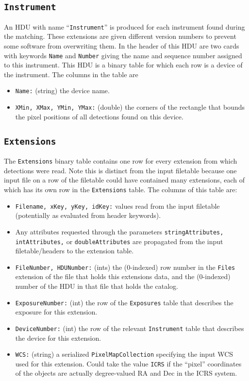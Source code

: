 \documentclass[11pt,preprint,flushrt]{aastex}
\begin{document}
\subsection{\tt Instrument}
An HDU with name ``{\tt Instrument}'' is produced for each instrument found during the matching.  These extensions are given different version numbers to prevent some software from overwriting them.  In the header of this HDU are two cards with keywords {\tt Name} and {\tt Number} giving the name and sequence number assigned to this instrument.  This HDU is a binary table for which each row is a device of the instrument.  The columns in the table are
\begin{itemize}
\item {\tt Name:} (string) the device name.
\item {\tt XMin, XMax, YMin, YMax:} (double) the corners of the rectangle that bounds the pixel positions of all detections found on this device.
\end{itemize}

\subsection{\tt Extensions}
The {\tt Extensions} binary table contains one row for every extension from which detections were read.  Note this is distinct from the input filetable because one input file on a row of the filetable could have contained many extensions, each of which has its own row in the {\tt Extensions} table.  The columns of this table are:
\begin{itemize}
\item {\tt Filename, xKey, yKey, idKey:} values read from the input filetable (potentially as evaluated from header keywords).
\item Any attributes requested through the parameters {\tt stringAttributes, intAttributes,} or {\tt doubleAttributes} are propagated from the input filetable/headers to the extension table.
\item {\tt FileNumber, HDUNumber:} (ints) the (0-indexed) row number in the {\tt Files} extension of the file that holds this extensions data, and the (0-indexed) number of the HDU in that file that holds the catalog.
\item {\tt ExposureNumber:} (int) the row of the {\tt Exposures} table that describes the exposure for this extension.
\item {\tt DeviceNumber:} (int) the row of the relevant {\tt Instrument} table that describes the device for this extension.
\item {\tt WCS:} (string) a serialized {\tt PixelMapCollection} specifying the input WCS used for this extension.  Could take the value {\tt ICRS} if the ``pixel'' coordinates of the objects are actually degree-valued RA and Dec in the ICRS system.
\end{itemize}
\end{document}

